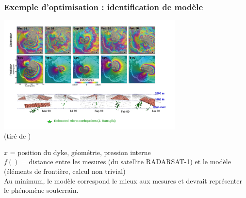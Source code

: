 \documentclass[12pt]{beamer}
\begin{document}
\begin{frame}
\begin{itemize}
\begin{frame}
\frametitle{Exemple d'optimisation : identification de modèle}
\begin{center}
\includegraphics[width=0.7\textwidth]{piton_fournaise.jpg}\\
\vspace{-1cm}
{\hfill\tiny (tiré de \cite{fukushima2010evolution})}
\end{center}
$x$ = position du dyke, géométrie, pression interne\\
$f()$ = distance entre les mesures (du satellite RADARSAT-1) et le modèle (éléments de frontière, calcul non trivial)\\
Au minimum, le modèle correspond le mieux aux mesures et devrait représenter le phénomène souterrain.
\end{frame}


\end{itemize}
\end{frame}
\end{document}
